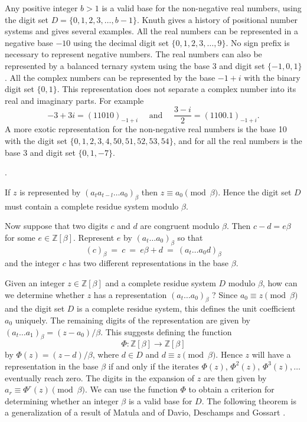 \documentclass[12pt]{article}
\newcommand{\Z}{\mathbb{Z}}
\begin{document}
    Any positive integer $b > 1$ is a valid base for the non-negative real
numbers, using the digit set $D = \{0,1,2,3,\ldots, b-1\}$. 
Knuth \cite[\S 4.1]{knuth} gives
a history of positional number systems and gives several examples. All the
real numbers can be represented in a negative base $-10$ using the decimal
digit set $\{0,1,2,3,\ldots, 9\}$. No sign prefix is necessary to represent negative numbers. 
The real numbers can also be represented by a balanced ternary
system using the base 3 and digit set $\{-1,0,1\}$. 
All the complex numbers can be represented by the base $-1 + i$ with the binary digit set $\{0,1\}$.
This representation does not separate a complex number into its real and
imaginary parts. For example
$$
-3 + 3i = (11010)_{-1+i} \quad \mbox{ and } \quad  \frac{3-i}2 = (1100.1)_{-1+i}.
$$
A more exotic representation for the non-negative real numbers \cite{odlyzko} is the
base 10 with the digit set $\{0,1,2,3,4,50,51,52,53,54\}$, and for all the real
numbers \cite{matula} is the base 3 and digit set $\{0,1,-7\}$.
\medskip

.
\smallskip

If $z$ is represented by $(a_ta_{t-l}\ldots a_0)_{\beta}$ then 
$z \equiv a_0\pmod{\beta}$. 
Hence the digit set $D$ must contain a complete residue system modulo $\beta$.

Now suppose that two digits $c$ and $d$ are congruent modulo $\beta$.  
Then
$c - d = e\beta$ for some $e\in \Z[\beta]$. 
Represent $e$ by $(a_t\ldots a_0)_{\beta}$ so that
$$
(c)_{\beta} \ = \ c \ = \ e\beta+d \ = \ (a_t\ldots a_0 d)_{\beta}
$$
and the integer $c$ has two different representations in the base $\beta$.
\hspace*{\fill}\fbox{\phantom{:}}\medskip

    Given an integer $z\in \Z[\beta]$ and a complete residue system $D$ modulo $\beta$, how can we determine whether $z$ has a representation $(a_t\ldots a_0)_{\beta}$ ? 
Since $a_0 \equiv z\pmod{\beta}$ and the digit set $D$ is a complete residue system, this defines the unit coefficient $a_0$ uniquely. 
The remaining digits of the representation
are given by $(a_t\ldots a_1)_{\beta} = (z-a_0)/\beta$. 
This suggests defining the function
$$
\Phi:\Z[\beta]\longrightarrow\Z[\beta]
$$
by $\Phi(z) =(z- d)/\beta$, where $d\in D$ and $d \equiv z\pmod{\beta}$.  
Hence $z$ will have a representation in the base  $\beta$ if and only if the iterates $\Phi(z)$, $\Phi^2(z)$, $\Phi^3(z), \ldots$  eventually reach zero. 
The digits in the expansion of $z$ are then given by 
$a_r \equiv \Phi^r(z)\pmod{\beta}$.  
We can use the function $\Phi$ to obtain a criterion for determining whether an integer $\beta$ is a valid base for $D$. 
The following theorem is a generalization of a result of Matula \cite{matula} and of Davio, Deschamps and Gossart \cite{davio}.
\end{document}
